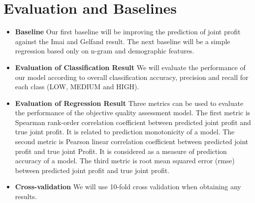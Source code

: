\documentclass[11pt]{article} %
\begin{document}
\section{Evaluation and Baselines} %
\begin{itemize}

\item \textbf{Baseline}
Our first baseline will be improving the prediction of joint profit against the Imai and Gelfand result.  The next baseline will be a simple regression based only on n-gram and demographic features.

\item \textbf{Evaluation of Classification Result}
We will evaluate the performance of our model according to overall classification accuracy, precision and recall for each class (LOW, MEDIUM and HIGH).




\item \textbf{Evaluation of Regression Result}
Three metrics can be used to evaluate the performance of the objective quality assessment model. The first metric is Spearman rank-order correlation coefficient between predicted joint profit and true joint profit. It is related to prediction monotonicity of a model. The second metric is Pearson linear correlation coefficient between predicted joint profit and true joint Profit. It is considered as a measure of prediction accuracy of a model. The third metric is root mean squared error (rmse) between predicted joint profit and true joint profit.

\item \textbf{Cross-validation}
We will use 10-fold cross validation when obtaining any results.

\end{itemize}
\end{document}
